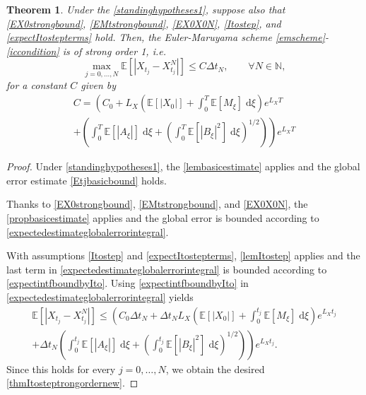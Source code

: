 \documentclass[reqno,12pt]{amsart}
\theoremstyle{plain}%
\newtheorem{thm}{Theorem}[section]
\theoremstyle{definition}
\begin{document}
\begin{thm}
    \label{thmItostep}
    Under the \cref{standinghypotheses1}, suppose also that
    \eqref{EX0strongbound}, \eqref{EMtstrongbound}, \eqref{EX0X0N}, \eqref{Itostep}, and \eqref{expectItostepterms} hold. Then, the Euler-Maruyama scheme \eqref{emscheme}-\eqref{iccondition} is of strong order 1, i.e.
    \begin{equation}
      \label{thmItosteptrongordernew}
        \max_{j=0, \ldots, N}\mathbb{E}\left[ \left| X_{t_j} - X_{t_j}^N \right| \right] \leq C \Delta t_N, \qquad \forall N \in \mathbb{N},
    \end{equation}
    for a constant $C$ given by
    \begin{multline}
        \label{constItostepboundstrongordernew}
        C = \left( C_0 +  L_X \left(\mathbb{E}[|X_0|] + \int_0^T \mathbb{E}[M_\xi]\;\mathrm{d}\xi\right)e^{L_X T}\right. \\
        \left. + \left(\int_0^T \mathbb{E}[|A_\xi|] \;\mathrm{d}\xi + \left(\int_0^T \mathbb{E}[|B_\xi|^2] \;\mathrm{d}\xi \right)^{1/2}\right)\right) e^{L_X T}
    \end{multline}
\end{thm}

\begin{proof}
    Under \cref{standinghypotheses1}, the \cref{lembasicestimate} applies and the global error estimate \eqref{Etjbasicbound} holds.
    
    Thanks to \eqref{EX0strongbound}, \eqref{EMtstrongbound}, and \eqref{EX0X0N}, the \cref{propbasicestimate} applies and the global error is bounded according to \eqref{expectedestimateglobalerrorintegral}.
    
    With assumptions \eqref{Itostep} and \eqref{expectItostepterms}, \cref{lemItostep} applies and the last term in \eqref{expectedestimateglobalerrorintegral} is bounded according to \eqref{expectintfboundbyIto}. Using \eqref{expectintfboundbyIto} in \eqref{expectedestimateglobalerrorintegral} yields
    \begin{multline*}
        \mathbb{E} \left[|X_{t_j} - X_{t_j}^N|\right] \leq \left( C_0 \Delta t_N + \Delta t_N L_X \left(\mathbb{E}[|X_0|] + \int_0^{t_j} \mathbb{E}[M_\xi]\;\mathrm{d}\xi\right)e^{L_X t_j}\right. \\
        \left. + \Delta t_N \left(\int_0^{t_j} \mathbb{E}[|A_\xi|] \;\mathrm{d}\xi + \left(\int_0^{t_j} \mathbb{E}[|B_\xi|^2] \;\mathrm{d}\xi \right)^{1/2}\right)\right) e^{L_X t_j}.
    \end{multline*}
    Since this holds for every $j=0, \ldots, N$, we obtain the desired \eqref{thmItosteptrongordernew}.
\end{proof}
\end{document}
